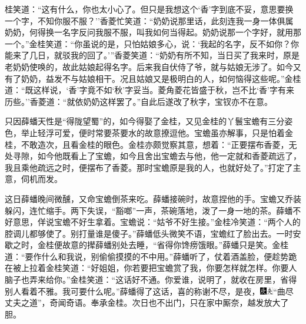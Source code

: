 桂笑道：``这有什么，你也太小心了。但只是我想这个`香'字到底不妥，意思要换一个字，不知你服不服？''香菱忙笑道：``奶奶说那里话，此刻连我一身一体俱属奶奶，何得换一名字反问我服不服，叫我如何当得起。奶奶说那一个字好，就用那一个。''金桂笑道：``你虽说的是，只怕姑娘多心，说：`我起的名字，反不如你？你能来了几日，就驳我的回了。'''香菱笑道：``奶奶有所不知，当日买了我来时，原是老奶奶使唤的，故此姑娘起得名字。后来我自伏侍了爷，就与姑娘无涉了。如今又有了奶奶，益发不与姑娘相干。况且姑娘又是极明白的人，如何恼得这些呢。''金桂道：``既这样说，`香'字竟不如`秋'字妥当。菱角菱花皆盛于秋，岂不比`香'字有来历些。''香菱道：``就依奶奶这样罢了。''自此后遂改了秋字，宝钗亦不在意。

只因薛蟠天性是``得陇望蜀''的，如今得娶了金桂，又见金桂的丫鬟宝蟾有三分姿色，举止轻浮可爱，便时常要茶要水的故意撩逗他。宝蟾虽亦解事，只是怕着金桂，不敢造次，且看金桂的眼色。金桂亦颇觉察其意，想着：``正要摆布香菱，无处寻隙，如今他既看上了宝蟾，如今且舍出宝蟾去与他，他一定就和香菱疏远了，我且乘他疏远之时，便摆布了香菱。那时宝蟾原是我的人，也就好处了。''打定了主意，伺机而发。

这日薛蟠晚间微醺，又命宝蟾倒茶来吃。薛蟠接碗时，故意捏他的手。宝蟾又乔装躲闪，连忙缩手。两下失误，``豁啷''一声，茶碗落地，泼了一身一地的茶。薛蟠不好意思，佯说宝蟾不好生拿着。宝蟾说：``姑爷不好生接。''金桂冷笑道：``两个人的腔调儿都够使了。别打量谁是傻子。''薛蟠低头微笑不语，宝蟾红了脸出去。一时安歇之时，金桂便故意的撵薛蟠别处去睡，``省得你馋痨饿眼。''薛蟠只是笑。金桂道：``要作什么和我说，别偷偷摸摸的不中用。''薛蟠听了，仗着酒盖脸，便趁势跪在被上拉着金桂笑道：``好姐姐，你若要把宝蟾赏了我，你要怎样就怎样。你要人脑子也弄来给你。''金桂笑道：``这话好不通。你爱谁，说明了，就收在房里，省得别人看着不雅。我可要什么呢。''薛蟠得了这话，喜的称谢不尽，是夜，{\includegraphics[width=3mm]{../Images/00004}\includegraphics[width=3mm]{../Images/00012}\footnotesize \kaishu ``曲尽丈夫之道''，奇闻奇语。}奉承金桂。次日也不出门，只在家中厮奈，越发放大了胆。

